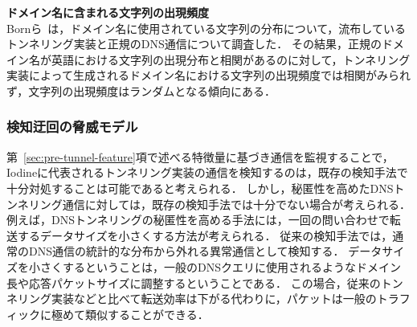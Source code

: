 

\textbf{ドメイン名に含まれる文字列の出現頻度}\\
Bornら~\cite{born}は，ドメイン名に使用されている文字列の分布について，流布しているトンネリング実装と正規のDNS通信について調査した．
その結果，正規のドメイン名が英語における文字列の出現分布と相関があるのに対して，トンネリング実装によって生成されるドメイン名における文字列の出現頻度では相関がみられず，文字列の出現頻度はランダムとなる傾向にある．



\subsubsection{検知迂回の脅威モデル}
\label{sec:bypass-method}
第~\ref{sec:pre-tunnel-feature}項で述べる特徴量に基づき通信を監視することで，Iodineに代表されるトンネリング実装の通信を検知するのは，既存の検知手法で十分対処することは可能であると考えられる．
しかし，秘匿性を高めたDNSトンネリング通信に対しては，既存の検知手法では十分でない場合が考えられる．
例えば，DNSトンネリングの秘匿性を高める手法には，一回の問い合わせで転送するデータサイズを小さくする方法が考えられる．
従来の検知手法では，通常のDNS通信の統計的な分布から外れる異常通信として検知する．
データサイズを小さくするということは，一般のDNSクエリに使用されるようなドメイン長や応答パケットサイズに調整するということである．
この場合，従来のトンネリング実装などと比べて転送効率は下がる代わりに，パケットは一般のトラフィックに極めて類似することができる．

